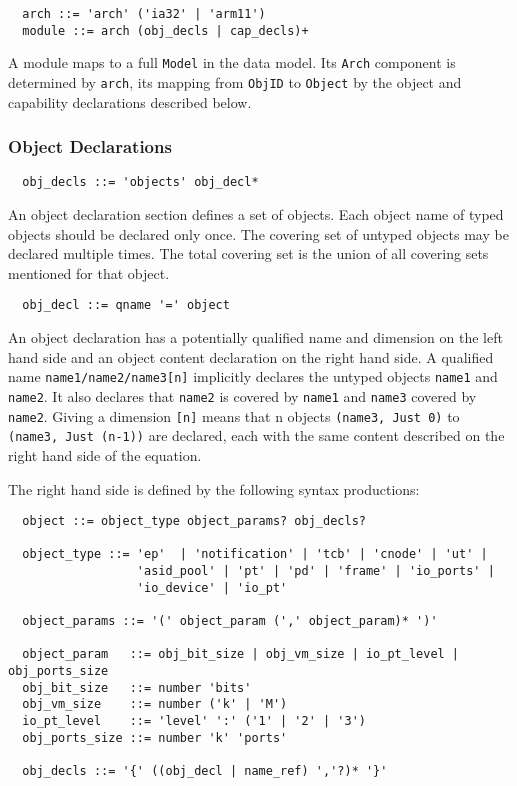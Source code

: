 \documentclass[a4paper,11pt]{article}
\begin{document}
\begin{verbatim}
  arch ::= 'arch' ('ia32' | 'arm11') 
  module ::= arch (obj_decls | cap_decls)+ 
\end{verbatim}

A module maps to a full \texttt{Model} in the data model. Its \texttt{Arch} component is determined by \texttt{arch}, its mapping from \texttt{ObjID} to \texttt{Object} by the object and capability declarations described below.


\subsubsection{Object Declarations}

\begin{verbatim}
  obj_decls ::= 'objects' obj_decl*
\end{verbatim}

An object declaration section defines a set of objects. Each object name of typed objects should be declared only once. The covering set of untyped objects may be declared multiple times. The total covering set is the union of all covering sets mentioned for that object.

\begin{verbatim}
  obj_decl ::= qname '=' object
\end{verbatim}

An object declaration has a potentially qualified name and dimension on the left hand side and an object content declaration on the right hand side. A qualified name \texttt{name1/name2/name3[n]} implicitly declares the untyped objects \texttt{name1} and \texttt{name2}. It also declares that \texttt{name2} is covered by \texttt{name1} and \texttt{name3} covered by \texttt{name2}. Giving a dimension \texttt{[n]} means that n objects \texttt{(name3, Just 0)} to \texttt{(name3, Just (n-1))} are declared, each with the same content described on the right hand side of the equation.

The right hand side is defined by the following syntax productions:

\begin{verbatim}
  object ::= object_type object_params? obj_decls?

  object_type ::= 'ep'  | 'notification' | 'tcb' | 'cnode' | 'ut' | 
                  'asid_pool' | 'pt' | 'pd' | 'frame' | 'io_ports' |
                  'io_device' | 'io_pt' 

  object_params ::= '(' object_param (',' object_param)* ')'

  object_param   ::= obj_bit_size | obj_vm_size | io_pt_level | obj_ports_size
  obj_bit_size   ::= number 'bits'
  obj_vm_size    ::= number ('k' | 'M')
  io_pt_level    ::= 'level' ':' ('1' | '2' | '3')
  obj_ports_size ::= number 'k' 'ports'

  obj_decls ::= '{' ((obj_decl | name_ref) ','?)* '}'
\end{verbatim}
\end{document}
